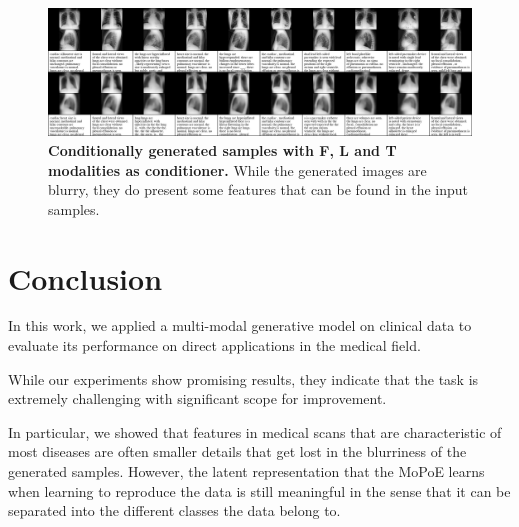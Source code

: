\documentclass{midl} %
\begin{document}
    \begin{figure}
        \centering
        \includegraphics[width=\textwidth]{data/cond_gen/Lateral_PA_text}
        \caption{
            \textbf{Conditionally generated samples with F, L and T modalities as conditioner.} While the generated images are blurry, they do present some features that can be found in the input samples.
        }
        \label{fig:fig_cond_latPAtext}
    \end{figure}
    
    

\section{Conclusion}
    In this work, we applied a multi-modal generative model on clinical data to evaluate its performance on direct applications in the medical field.
    
    While our experiments show promising results, they indicate that the task is extremely challenging with significant scope for improvement.
    
    In particular, we showed that features in medical scans that are characteristic of most diseases are often smaller details that get lost in the blurriness of the generated samples.
    However, the latent representation that the MoPoE learns when learning to reproduce the data is still meaningful in the sense that it can be separated into the different classes the data belong to.
\end{document}
